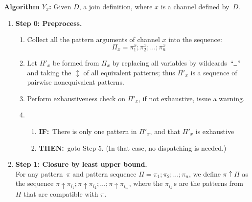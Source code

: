 \documentclass{LMCS}
\newcommand{\pt}{\pi}
\newcommand{\pts}{\Pi}
\newcommand{\lubop}{\mathop{\uparrow}}
\newcommand{\lub}[2]{#1 \lubop #2}
\newcommand{\repr}[2]{#1 \mathop{\updownarrow} #2}
\renewcommand{\_}{\mathord{\rule[-.25ex]{1ex}{.15ex}}}
\begin{document}
\medskip\noindent \textbf{Algorithm $Y_x$:}
Given $D$, a join definition, where $x$ is a channel defined by~$D$.
\begin{enumerate}[\ ]
\item {\bf Step 0: Preprocess.} \hspace*{1cm}
  \begin{enumerate}[(1)]
  \item Collect all the pattern arguments of channel $x$ into the
    sequence: $$\pts_x = \pt^{x}_1; \pt^x_2; \ldots; \pt^x_n$$
  \item Let $\pts'_x$ be formed from $\pts_x$ by replacing all
    variables by wildcards~``$\_$'' and taking the $\repr{}{}$ of all
    equivalent patterns; thus $\pts'_x$ is a sequence of pairwise
    nonequivalent patterns.
  \item Perform exhaustiveness check on $\pts'_x$, if not exhaustive,
    issue a warning.
  \item
\begin{enumerate}[\ ]
    \item {\bf IF:}\ There is only one pattern in $\pts'_x$, and that
      $\pts'_x$ is exhaustive
    \item {\bf THEN:}\ goto Step 5. (In that case, no dispatching is needed.)
    \end{enumerate}
  \end{enumerate}
\item {\bf Step 1: Closure by least upper bound.} \hspace*{1cm} \\
  For any pattern~$\pt$ and pattern sequence $\pts = \pt_1 ; \pt_2 ;
  \ldots{} ; \pt_n$, we define $\lub{\pt}{\pts}$ as the sequence
  $\lub{\pt}{\pt_{i_1}} ; \lub{\pt}{\pt_{i_2}} ; \ldots ;
  \lub{\pt}{\pt_{i_m}}$, where the $\pt_{i_k}$\,s are the patterns from
  $\pts$ that are compatible with $\pt$.


\end{enumerate}
\end{document}
